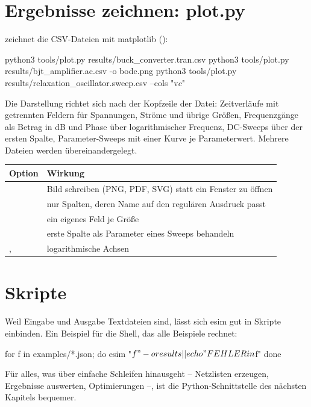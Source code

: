 \section{Ergebnisse zeichnen: plot.py}

 zeichnet die CSV-Dateien mit matplotlib
():

\begin{shell}
python3 tools/plot.py results/buck_converter.tran.csv
python3 tools/plot.py results/bjt_amplifier.ac.csv -o bode.png
python3 tools/plot.py results/relaxation_oscillator.sweep.csv --cols "v\(c\)"
\end{shell}

Die Darstellung richtet sich nach der Kopfzeile der Datei: Zeitverläufe mit
getrennten Feldern für Spannungen, Ströme und übrige Größen, Frequenzgänge
als Betrag in dB und Phase über logarithmischer Frequenz, DC-Sweeps über der
ersten Spalte, Parameter-Sweeps mit einer Kurve je Parameterwert. Mehrere
Dateien werden übereinandergelegt.

\begin{center}
\begin{tabularx}{\textwidth}{@{}lL@{}}
  \toprule
  Option & Wirkung \\
  \midrule
   & Bild schreiben (PNG, PDF, SVG) statt ein Fenster zu öffnen \\
   & nur Spalten, deren Name auf den regulären Ausdruck passt \\
   & ein eigenes Feld je Größe \\
   & erste Spalte als Parameter eines Sweeps behandeln \\
  ,  & logarithmische Achsen \\
  \bottomrule
\end{tabularx}
\end{center}

\section{Skripte}

Weil Eingabe und Ausgabe Textdateien sind, lässt sich esim gut in Skripte
einbinden. Ein Beispiel für die Shell, das alle Beispiele rechnet:

\begin{shell}
for f in examples/*.json; do
  esim "$f" -o results || echo "FEHLER in $f"
done
\end{shell}

Für alles, was über einfache Schleifen hinausgeht – Netzlisten erzeugen,
Ergebnisse auswerten, Optimierungen –, ist die Python-Schnittstelle des
nächsten Kapitels bequemer.
